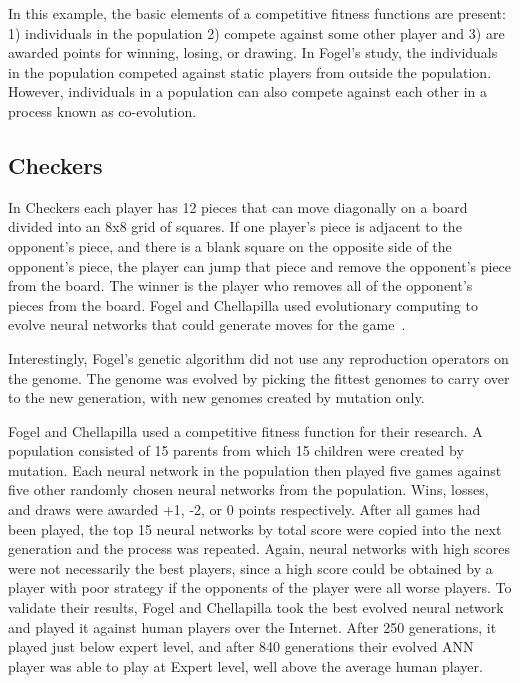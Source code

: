 In this example, the basic elements of a competitive fitness functions are
present: 1) individuals in the population 2) compete against some other player
and 3) are awarded points for winning, losing, or drawing. In Fogel's study, the
individuals in the population competed against static players from outside the
population. However, individuals in a population can also compete against each
other in a process known as co-evolution.

\subsection{Checkers}

In Checkers each player has 12 pieces that can move diagonally on a board
divided into an 8x8 grid of squares. If one player's piece is adjacent to the
opponent's piece, and there is a blank square on the opposite side of the
opponent's piece, the player can jump that piece and remove the opponent's piece
from the board. The winner is the player who removes all of the opponent's
pieces from the board. Fogel and Chellapilla used evolutionary computing  to
evolve neural networks that could generate moves for the
game~\cite{Fogel2000Anaconda,journals/tec/ChellapillaF01}. 

Interestingly, Fogel's genetic algorithm did not use any reproduction operators
on the genome. The genome was evolved by picking the fittest genomes to carry
over to the new generation, with new genomes created by mutation only.

Fogel and Chellapilla used a competitive fitness function for their research.
A population consisted of 15 parents from which 15 children were created by
mutation. Each neural network in the population then played five games against
five other randomly chosen neural networks from the population. Wins, losses,
and draws were awarded +1, -2, or 0 points respectively. After all games had
been played, the top 15 neural networks by total score were copied into the next
generation and the process was repeated. Again, neural networks with high scores
were not necessarily the best players, since a high score could be obtained by a
player with poor strategy if the opponents of the player were all worse players.
To validate their results, Fogel and Chellapilla took the best evolved neural
network and played it against human players over the Internet. After 250
generations, it played just below expert level, and after 840 generations their
evolved ANN player was able to play at Expert level, well above the average
human player.

